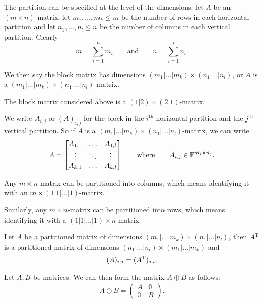 The partition can be specified at the level of the dimensions: let $A$ be an $(m\times n)$-matrix, let $m_1,\ldots, m_k\leq m$ be the number of rows in each horizontal partition and let $n_1,\ldots, n_l\leq n$ be the number of columns in each vertical partition. Clearly
\[ m = \sum_{i=1}^k m_i \qquad \text{and} \qquad n = \sum_{i=1}^l n_i. \]

We then say the block matrix has dimensions $(m_1|\ldots|m_k) \times (n_1|\ldots|n_l)$, or $A$ is a $(m_1|\ldots|m_k) \times (n_1|\ldots|n_l)$-matrix.

\begin{example}
The block matrix considered above is a $(1|2)\times (2|1)$-matrix.
\end{example}

We write $A_{i,j}$ or $(A)_{i,j}$ for the block in the $i^\text{th}$ horizontal partition and the $j^\text{th}$ vertical partition. So if $A$ is a $(m_1|\ldots|m_k) \times (n_1|\ldots|n_l)$-matrix, we can write
\[ A = \begin{bmatrix}
A_{1,1} & \hdots & A_{1,l} \\
\vdots & \ddots & \vdots \\
A_{k,1} & \hdots & A_{k,l}
\end{bmatrix} \qquad \text{where} \qquad A_{i,j}\in\mathbb{F}^{m_i\times n_j}. \]

Any $m\times n$-matrix can be partitioned into columns, which means identifying it with an $m\times (1|1|\ldots|1)$-matrix.

Similarly, any $m\times n$-matrix can be partitioned into rows, which means identifying it with a $(1|1|\ldots|1)\times n$-matrix.

\begin{lemma}
Let $A$ be a partitioned matrix of dimensions $(m_1|\ldots|m_k) \times (n_1|\ldots|n_l)$, then $A^{\mathrm{T}}$ is a partitioned matrix of dimensions $(n_1|\ldots|n_l) \times (m_1|\ldots|m_k)$ and
\[ (A)_{i,j} = (A^{\mathrm{T}})_{j,i}. \]
\end{lemma}

\begin{definition}
Let $A,B$ be matrices. We can then form the  matrix $A\oplus B$ as follows:
\[ A\oplus B = \begin{pmatrix}
A & \mathbb{0} \\ \mathbb{0} & B
\end{pmatrix}. \]
\end{definition}

